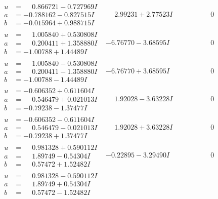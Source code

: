 \documentclass[1p]{elsarticle_modified}
\theoremstyle{definition}
\begin{document}
$$\begin{array}{c|c|c}
\begin{aligned}
u &= \phantom{-}0.866721 - 0.727969 I \\
a &= -0.788162 - 0.827515 I \\
b &= -0.015964 + 0.988715 I\end{aligned}
 & \phantom{-}2.99231 + 2.77523 I & \phantom{-0.000000 } 0 \\ \hline\begin{aligned}
u &= \phantom{-}1.005840 + 0.530808 I \\
a &= \phantom{-}0.200411 + 1.358880 I \\
b &= -1.00788 + 1.44489 I\end{aligned}
 & -6.76770 - 3.68595 I & \phantom{-0.000000 } 0 \\ \hline\begin{aligned}
u &= \phantom{-}1.005840 - 0.530808 I \\
a &= \phantom{-}0.200411 - 1.358880 I \\
b &= -1.00788 - 1.44489 I\end{aligned}
 & -6.76770 + 3.68595 I & \phantom{-0.000000 } 0 \\ \hline\begin{aligned}
u &= -0.606352 + 0.611604 I \\
a &= \phantom{-}0.546479 + 0.021013 I \\
b &= -0.79238 - 1.37477 I\end{aligned}
 & \phantom{-}1.92028 - 3.63228 I & \phantom{-0.000000 } 0 \\ \hline\begin{aligned}
u &= -0.606352 - 0.611604 I \\
a &= \phantom{-}0.546479 - 0.021013 I \\
b &= -0.79238 + 1.37477 I\end{aligned}
 & \phantom{-}1.92028 + 3.63228 I & \phantom{-0.000000 } 0 \\ \hline\begin{aligned}
u &= \phantom{-}0.981328 + 0.590112 I \\
a &= \phantom{-}1.89749 - 0.54304 I \\
b &= \phantom{-}0.57472 + 1.52482 I\end{aligned}
 & -0.22895 - 3.29490 I & \phantom{-0.000000 } 0 \\ \hline\begin{aligned}
u &= \phantom{-}0.981328 - 0.590112 I \\
a &= \phantom{-}1.89749 + 0.54304 I \\
b &= \phantom{-}0.57472 - 1.52482 I\end{aligned}

\end{array}$$
\end{document}
